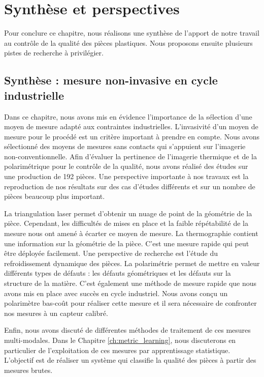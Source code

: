 \newpage


\section{Synthèse et perspectives}  \label{sec:measure_perspective}
Pour conclure ce chapitre, nous réalisons une synthèse de l'apport de notre travail au contrôle de la qualité des pièces plastiques.
Nous proposons ensuite plusieurs pistes de recherche à privilégier.

\subsection{Synthèse : mesure non-invasive en cycle industrielle}
Dans ce chapitre, nous avons mis en évidence l'importance de la sélection d'une moyen de mesure adapté aux contraintes industrielles.
L'invasivité d'un moyen de mesure pour le procédé est un critère important à prendre en compte.
Nous avons sélectionné des moyens de mesures sans contacts qui s'appuient sur l'imagerie non-conventionnelle.
Afin d'évaluer la pertinence de l'imagerie thermique et de la polarimétrique pour le contrôle de la qualité, nous avons réalisé des études sur une production de 192 pièces.
Une perspective importante à nos travaux est la reproduction de nos résultats sur des cas d'études différents et sur un nombre de pièces beaucoup plus important.

La triangulation laser permet d'obtenir un nuage de point de la géométrie de la pièce.
Cependant, les difficultés de mises en place et la faible répétabilité de la mesure nous ont amené à écarter ce moyen de mesure.
La thermographie contient une information sur la géométrie de la pièce.
C'est une mesure rapide qui peut être déployée facilement.
Une perspective de recherche est l'étude du refroidissement dynamique des pièces. 
La polarimétrie permet de mettre en valeur différents types de défauts : les défauts géométriques et les défauts sur la structure de la matière.
C'est également une méthode de mesure rapide que nous avons mis en place avec succès en cycle industriel.
Nous avons conçu un polarimètre bas-coût pour réaliser cette mesure et il sera nécessaire de confronter nos mesures à un capteur calibré.

Enfin, nous avons discuté de différentes méthodes de traitement de ces mesures multi-modales.
Dans le Chapitre \ref{ch:metric_learning}, nous discuterons en particulier de l'exploitation de ces mesures par apprentissage statistique.
L'objectif est de réaliser un système qui classifie la qualité des pièces à partir des mesures brutes.

